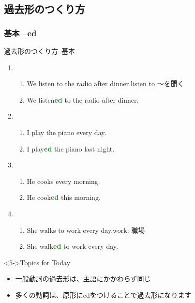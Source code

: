 \documentclass[aspectratio=169,xcolor={dvipsnames,table}]{beamer}
\newcommand{\myaudio}[1]{\href{#1}{\faVolumeUp}}
\begin{document}
\subsection{過去形のつくり方}
\subsubsection{基本 --ed}
\begin{frame}[plain]{過去形のつくり方--基本--}
 
\begin{enumerate}
 \item<1-> \begin{enumerate}
	\item We listen to the radio after dinner.\hfill{\scriptsize listen to ～を聞く\,}
	\item We listen\textcolor{ForestGreen}{\bfseries ed} to the radio after dinner.
       \end{enumerate}
 \item<2-> \begin{enumerate}
	\item I play the piano every day.
	\item I play\textcolor{ForestGreen}{\bfseries ed} the piano last night.
       \end{enumerate}
 \item<3-> \begin{enumerate}
	\item He cooks every morning.
	\item He cook\textcolor{ForestGreen}{\bfseries ed} this morning.
       \end{enumerate}

 \item<4-> \begin{enumerate}
	\item She walks to work every day.\hfill{}{\scriptsize work: 職場}
	\item She walk\textcolor{ForestGreen}{\bfseries ed} to work every day.
       \end{enumerate}
\end{enumerate}

\begin{block}<5->{Topics for Today}\small
\begin{itemize}[square]
 \item 一般動詞の過去形は、主語にかかわらず同じ
 \item 多くの動詞は、原形にedをつけることで過去形になります
\end{itemize}
\end{block}
\hfill\myaudio{./audio/025_past_do_02.mp3}

\end{frame}
\end{document}
